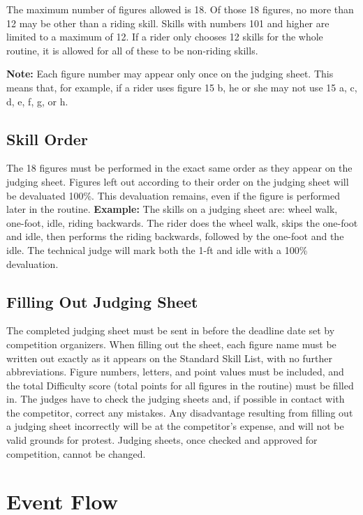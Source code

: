 The maximum number of figures allowed is 18.
Of those 18 figures, no more than 12 may be other than a riding skill.
Skills with numbers 101 and higher are limited to a maximum of 12.
If a rider only chooses 12 skills for the whole routine, it is allowed for all of these to be non-riding skills.

\textbf{Note:} Each figure number may appear only once on the judging sheet.
This means that, for example, if a rider uses figure 15 b, he or she may not use 15 a, c, d, e, f, g, or h.

\subsection{Skill Order}
The 18 figures must be performed in the exact same order as they appear on the judging sheet.
Figures left out according to their order on the judging sheet will be devaluated 100\%.
This devaluation remains, even if the figure is performed later in the routine.
\textbf{Example:} The skills on a judging sheet are: wheel walk, one-foot, idle, riding backwards.
The rider does the wheel walk, skips the one-foot and idle, then performs the riding backwards, followed by the one-foot and the idle.
The technical judge will mark both the 1-ft and idle with a 100\% devaluation.

\subsection{Filling Out Judging Sheet}
The completed judging sheet must be sent in before the deadline date set by competition organizers.
When filling out the sheet, each figure name must be written out exactly as it appears on the Standard Skill List, with no further abbreviations.
Figure numbers, letters, and point values must be included, and the total Difficulty score (total points for all figures in the routine) must be filled in.
The judges have to check the judging sheets and, if possible in contact with the competitor, correct any mistakes.
Any disadvantage resulting from filling out a judging sheet incorrectly will be at the competitor's expense, and will not be valid grounds for protest.
Judging sheets, once checked and approved for competition, cannot be changed.

\section{Event Flow}

